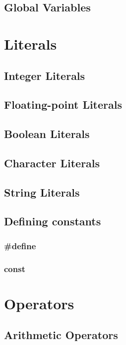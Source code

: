 \documentclass[10pt,a4paper]{scrartcl}
\begin{document}
\begin{multicols*}{2}
\subsection{Global Variables}

\section{Literals}

\subsection{Integer Literals}

\subsection{Floating-point Literals}

\subsection{Boolean Literals}

\subsection{Character Literals}

\subsection{String Literals}

\subsection{Defining constants}

\subsubsection{\#define}

\subsubsection{const}

\section{Operators}

\subsection{Arithmetic Operators}


\end{multicols*}
\end{document}
